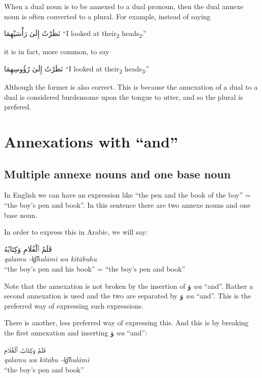 \documentclass[
  10pt,
]{book}
\begin{document}
When a dual noun is to be annexed to a dual pronoun, then the dual annexe noun is often converted to a plural. For example, instead of saying

\foreignlanguage{arabic}{نَظَرْتُ إِلَىٰ رَأْسَيْهِمَا}
\enquote{I looked at their\textsubscript{2} heads\textsubscript{2}.}

it is in fact, more common, to say

\foreignlanguage{arabic}{نَظَرْتُ إِلَىٰ رُؤُوسِهِمَا}
\enquote{I looked at their\textsubscript{2} heads\textsubscript{3}.}

Although the former is also correct. This is because the annexation of a dual to a dual is considered burdensome upon the tongue to utter, and so the plural is prefered.

\section{\texorpdfstring{Annexations with \enquote{and}}{Annexations with ``and''}}\label{annexations-with-and}

\subsection{Multiple annexe nouns and one base noun}\label{multiple-annexe-nouns-and-one-base-noun}

In English we can have an expression like \enquote{the pen and the book of the boy} = \enquote{the boy's pen and book}. In this sentence there are two annexe nouns and one base noun.

In order to express this in Arabic, we will say:

\foreignlanguage{arabic}{قَلَمُ ٱلْغُلَامِ وَکِتَابُهُ}\\
\emph{qalamu -lg͡hulāmi wa kitābuhu}\\
\enquote{the boy's pen and his book} = \enquote{the boy's pen and book}

Note that the annexation is not broken by the insertion of \foreignlanguage{arabic}{وَ} \emph{wa} \enquote{and}. Rather a second annexation is used and the two are separated by \foreignlanguage{arabic}{وَ} \emph{wa} \enquote{and}. This is the preferred way of expressing such expressions.

There is another, less preferred way of expressing this. And this is by breaking the first annexation and inserting \foreignlanguage{arabic}{وَ} \emph{wa} \enquote{and}:

\foreignlanguage{arabic}{قَلَمُ وَکِتَابُ ٱلْغُلَامِ}\\
\emph{qalamu wa kitābu -lg͡hulāmi}\\
\enquote{the boy's pen and book}
\end{document}
